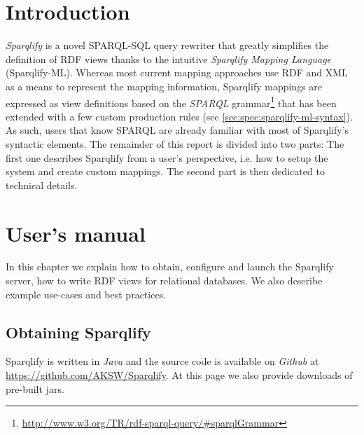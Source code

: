 \documentclass[a4paper,twoside,bibtotoc,abstracton,12pt,BCOR=15mm]{scrreprt}
\begin{document}
 


% 




\tableofcontents

\chapter*{Introduction}
\emph{Sparqlify} is a novel SPARQL-SQL query rewriter that greatly simplifies the definition of RDF views thanks to the intuitive
\emph{Sparqlify Mapping Language} (Sparqlify-ML).
Whereas most current mapping approaches use RDF and XML as a means to represent the mapping information,
Sparqlify mappings are expressed as view definitions based on the \emph{SPARQL} grammar\footnote{\url{http://www.w3.org/TR/rdf-sparql-query/\#sparqlGrammar}} that has been
extended with a few custom production rules (see \autoref{sec:spec:sparqlify-ml-syntax}).
As such, users that know SPARQL are already familiar with most of Sparqlify's syntactic elements.
The remainder of this report is divided into two parts:
The first one describes Sparqlify from a user's perspective, i.e. how
to setup the system and create custom mappings. 
The second part is then dedicated to technical details. 


\chapter{User's manual}
In this chapter we explain how to obtain, configure and launch the Sparqlify server, 
how to write RDF views for relational databases.
We also describe example use-cases and best practices.

\section{Obtaining Sparqlify}
Sparqlify is written in \emph{Java} and the source code is available on \emph{Github} at \url{https://github.com/AKSW/Sparqlify}.
At this page we also provide downloads of pre-built jars.
\end{document}

